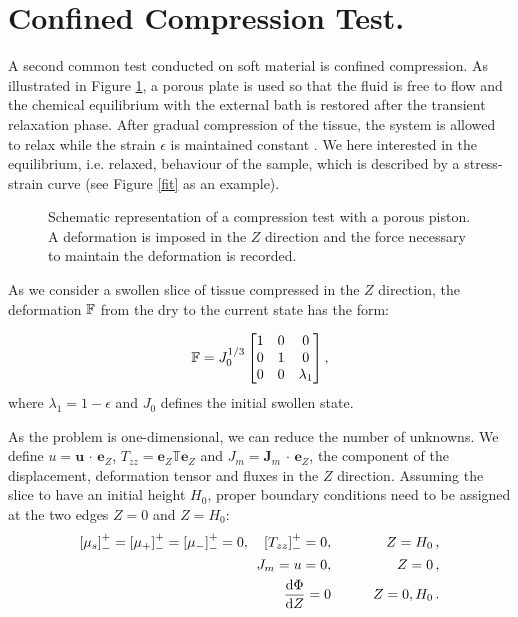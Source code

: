 \section{Confined Compression Test.}
\label{excomp}
A second common test conducted on soft material is confined compression. As illustrated in Figure \ref{confcomp}, a porous plate is used so that the fluid is free to flow and the chemical equilibrium with the external bath is restored after the transient relaxation phase. After gradual compression of the tissue, the system is allowed to relax while the strain $\epsilon$ is maintained constant \cite{Netti}. We here interested in the equilibrium, i.e. relaxed, behaviour of the sample, which is described by a stress-strain curve (see Figure \ref{fit} as an example). 

\begin{figure}[h]
	\centering
	\def\svgwidth{0.89\linewidth}
	
	\vspace{2mm}
	\caption{Schematic representation of a compression test with a porous piston. A deformation is imposed in the $Z$ direction and the force necessary to maintain the deformation is recorded. }
	\label{confcomp}
\end{figure}

As we consider a swollen slice of tissue compressed in the $Z$ direction, the deformation $\mathbb{F}$ from the dry to the current state has the form:

\begin{equation}
\mathbb{F}=J_0^{1/3}\begin{bmatrix}
1 &0&0\\
0&1&0\\
0&0& \lambda_1
\end{bmatrix},
\label{F} 
\end{equation}
where $\lambda_1 = 1 - \epsilon$ and $J_0$ defines the initial swollen state. 

As the problem is one-dimensional, we can reduce the number of unknowns. We define $u=\mathbf{u}\,\cdot\,\mathbf{e}_Z$, $T_{zz}= \mathbf{e}_Z \mathbb{T}\mathbf{e}_Z$ and $J_m=\mathbf{J}_m\,\cdot \,\mathbf{e}_Z$, the component of the displacement, deformation tensor and fluxes in the $Z$ direction. Assuming the slice to have an initial height $H_0$, proper boundary conditions need to be assigned at the two edges $Z=0$ and $Z=H_0$:
\begin{eqnarray}
\left[\mu_s\right]^+_-=\left[\mu_+\right]^+_-=\left[\mu_-\right]^+_-=0, \quad \left[T_{zz}\right]^+_-=0, &\qquad& Z=H_0\,,\\
J_m = u = 0, &\qquad& Z=0\, ,\\
\frac{\text{d} \Phi}{\text{d} Z}=0 &\qquad& Z=0,H_0\,.
\end{eqnarray}

